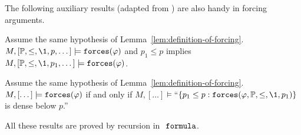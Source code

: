 The following auxiliary results (adapted from
\cite[IV.2.43]{kunen2011set}) are also handy in forcing arguments.
\begin{lemma}[Strengthening]\label{lem:strengthen} 
  Assume the same hypothesis of Lemma~\ref{lem:definition-of-forcing}.
  $M, [\PP,\leq,\1,p,\dots]\models\forceisa(\phi)$ and $p_1\leq p$
  implies $M, [\PP,\leq,\1,p_1,\dots]\models\forceisa(\phi)$.
\end{lemma}
\begin{lemma}[Density]\label{lem:density}
  Assume the same hypothesis of
  Lemma~\ref{lem:definition-of-forcing}. $M,[\dots]\models\mathop{\mathtt{forces}}(\varphi)$ 
  if and only if 
  $M,[\dots]\models$``$\{p_1\leq p : \forceisa(\phi,\PP,\leq,\1,p_1)\}$ is
  dense below $p$.''
\end{lemma}
%
All these results are proved by recursion in
$\formula$.

